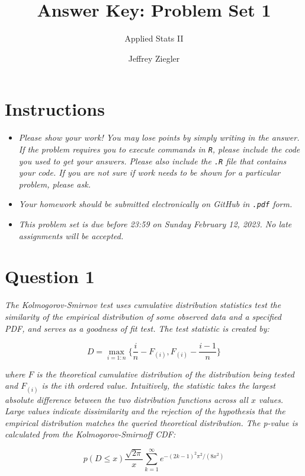 \documentclass[12pt,letterpaper]{article}
\title{Answer Key: Problem Set 1}
\date{Jeffrey Ziegler}
\author{Applied Stats II}
\begin{document}
	\maketitle
	
	\section*{Instructions}
	\begin{itemize}
		\item \textit{Please show your work! You may lose points by simply writing in the answer. If the problem requires you to execute commands in \texttt{R}, please include the code you used to get your answers. Please also include the \texttt{.R} file that contains your code. If you are not sure if work needs to be shown for a particular problem, please ask.}
			\item \textit{Your homework should be submitted electronically on GitHub in \texttt{.pdf} form.}
			\item \textit{This problem set is due before 23:59 on Sunday February 12, 2023. No late assignments will be accepted.}

	\end{itemize}
	\vspace{.25cm}
	
	\section*{Question 1}
	\vspace{.25cm}
	\noindent \emph{The Kolmogorov-Smirnov test uses cumulative distribution statistics test the similarity of the empirical distribution of some observed data and a specified PDF, and serves as a goodness of fit test. The test statistic is created by:}
	
	$$D = \max_{i=1:n} \Big\{ \frac{i}{n}  - F_{(i)}, F_{(i)} - \frac{i-1}{n} \Big\}$$
	
	\noindent \emph{where $F$ is the theoretical cumulative distribution of the distribution being tested and $F_{(i)}$ is the $i$th ordered value. Intuitively, the statistic takes the largest absolute difference between the two distribution functions across all $x$ values. Large values indicate dissimilarity and the rejection of the hypothesis that the empirical distribution matches the queried theoretical distribution. The p-value is calculated from the Kolmogorov-Smirnoff CDF:}
	
	$$p(D \leq x) \frac{\sqrt {2\pi}}{x} \sum _{k=1}^{\infty }e^{-(2k-1)^{2}\pi ^{2}/(8x^{2})}$$
	
\end{document}
